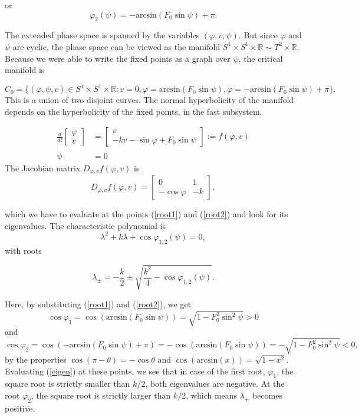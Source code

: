 \documentclass[a4paper,11pt,pdftex]{article}
\begin{document}
or
\begin{equation}
\label{root2}
    \varphi_2(\psi) = -\text{arcsin}(F_0 \sin \psi) + \pi.
\end{equation}

The extended phase space is spanned by the variables $(\varphi, v, \psi)$. But since $\varphi$ and $\psi$ are cyclic, the phase space can be viewed as the manifold $S^1 \times S^1 \times \mathbb{R}  \sim T^2 \times \mathbb{R}$. Because we were able to write the fixed points as a graph over $\psi$, the critical manifold is

$$
C_0 = \{ (\varphi, \psi, v) \in S^1 \times S^1 \times \mathbb{R} : v = 0, \varphi = \text{arcsin}(F_0 \sin \psi), \varphi = -\text{arcsin}(F_0 \sin \psi) + \pi
\}.
$$
This is a union of two disjoint curves. The normal hyperbolicity of the manifold depends on the hyperbolicity of the fixed points, in the fast subsystem. 

\begin{align*}
    \frac{d}{dt}\begin{bmatrix}
    \varphi \\
    v 
    \end{bmatrix} &= \begin{bmatrix} 
     v \\
    -k v - \sin \varphi + F_0 \sin \psi 
    \end{bmatrix} := f(\varphi, v) \\
    \dot{\psi} &= 0 
\end{align*}
The Jacobian matrix $D_{\varphi, v} f(\varphi,v)$ is
$$
D_{\varphi, v} f(\varphi,v) = \begin{bmatrix} 
0 & 1 \\
-\cos \varphi & -k
\end{bmatrix},
$$

which we have to evaluate at the points (\ref{root1}) and (\ref{root2}) and look for its eigenvalues. The characteristic polynomial is 
$$
\lambda^2  + k \lambda + \cos \varphi_{1,2}(\psi) = 0,
$$
with roots

\begin{equation}
\label{eigen}
    \lambda_{\pm} =  -\frac{k}{2} \pm \sqrt{\frac{k^2}{4} - \cos \varphi_{1,2}(\psi)}.
\end{equation}

Here, by substituting (\ref{root1}) and (\ref{root2}), we get
$$
\cos \varphi_1 = \cos (\text{arcsin}(F_0\sin \psi) ) = \sqrt{1 - F_0^2 \sin^2 \psi} >0
$$
and
$$
\cos \varphi_2 = \cos (-\text{arcsin}(F_0\sin \psi)+\pi) = -\cos( \text{arcsin}(F_0\sin \psi)) = - \sqrt{1 - F_0^2 \sin^2 \psi} <0,
$$
by the properties $\cos(\pi - \theta) = - \cos \theta$ and $\cos(\text{arcsin}(x)) = \sqrt{1-x^2}$.
Evaluating (\ref{eigen}) at these points, we see that in case of the first root, $\varphi_1$, the square root is strictly smaller than $k/2$, both eigenvalues are negative.
At the root $\varphi_2$, the square root is strictly larger than $k/2$, which means $\lambda_+$ becomes positive. 
\end{document}
